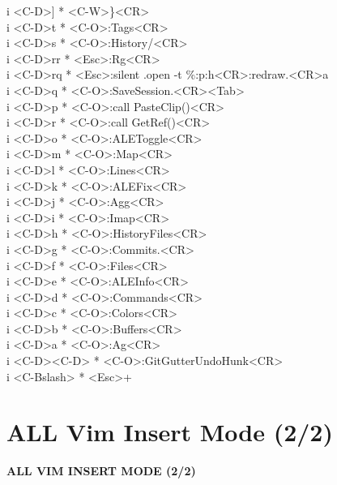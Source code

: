 \documentclass[11pt,a4paper,twoside]{book}
\begin{document}
i  <C-D>]  * <C-W>\}<CR>\\
i  <C-D>t  * <C-O>:Tags<CR>\\
i  <C-D>s  * <C-O>:History/<CR>\\
i  <C-D>rr  * <Esc>:Rg<CR>\\
i  <C-D>rq  * <Esc>:silent .open -t \%:p:h<CR>:redraw.<CR>a\\
i  <C-D>q  * <C-O>:SaveSession.<CR><Tab>\\
i  <C-D>p  * <C-O>:call PasteClip()<CR>\\
i  <C-D>r  * <C-O>:call GetRef()<CR>\\
i  <C-D>o  * <C-O>:ALEToggle<CR>\\
i  <C-D>m  * <C-O>:Map<CR>\\
i  <C-D>l  * <C-O>:Lines<CR>\\
i  <C-D>k  * <C-O>:ALEFix<CR>\\
i  <C-D>j  * <C-O>:Agg<CR>\\
i  <C-D>i  * <C-O>:Imap<CR>\\
i  <C-D>h  * <C-O>:HistoryFiles<CR>\\
i  <C-D>g  * <C-O>:Commits.<CR>\\
i  <C-D>f  * <C-O>:Files<CR>\\
i  <C-D>e  * <C-O>:ALEInfo<CR>\\
i  <C-D>d  * <C-O>:Commands<CR>\\
i  <C-D>c  * <C-O>:Colors<CR>\\
i  <C-D>b  * <C-O>:Buffers<CR>\\
i  <C-D>a  * <C-O>:Ag<CR>\\
i  <C-D><C-D>  * <C-O>:GitGutterUndoHunk<CR>\\
i  <C-Bslash>  * <Esc>+\\


\vspace{16pt}

\section{ALL Vim Insert Mode (2/2)}


\vspace{10pt}
{\large\bfseries\color{neoncyan} ALL VIM INSERT MODE (2/2)}\vspace{6pt}
\end{document}
